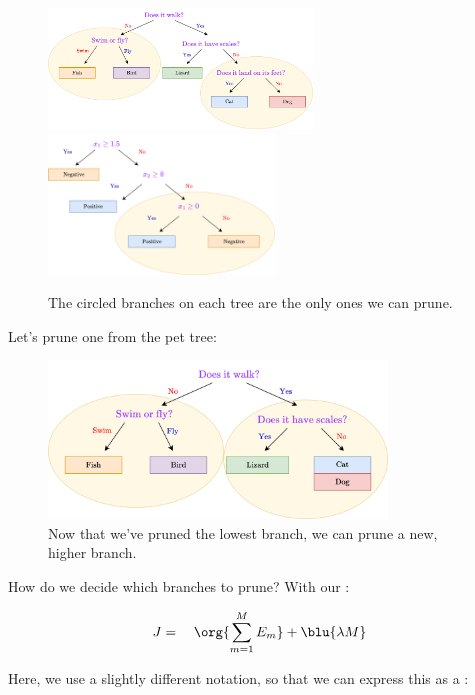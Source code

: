         \begin{figure}[H]
            \centering
            \includegraphics[width=70mm,scale=0.5]{images/nonparametric_images/tree_complex_prune.png}
            \includegraphics[width=60mm,scale=0.5]{images/nonparametric_images/x1_geq_0_tree_prune.png}
            \caption*{The circled branches on each tree are the only ones we can prune.}
        \end{figure}

        Let's prune one from the pet tree:

        \begin{figure}[H]
            \centering
            \includegraphics[width=90mm,scale=0.5]{images/nonparametric_images/tree_complex_pruned.png}
            \caption*{Now that we've pruned the lowest branch, we can prune a new, higher branch.}
        \end{figure}

        How do we decide which branches to prune? With our :

        \begin{equation}
            J = \quad \org{\sum_{m=1}^M E_m} + \blu{\lambda M}
        \end{equation}

        Here, we use a slightly different notation, so that we can express this as a :
            \\

